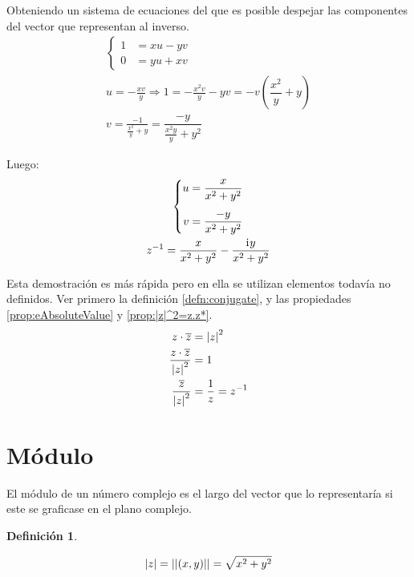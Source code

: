 \documentclass[a5paper,12pt,twoside]{book}
\newtheorem{defn}{{Definición}}[chapter]
\begin{document}
Obteniendo un sistema de ecuaciones del que es posible despejar las componentes del vector que representan al inverso.
\begin{gather*}
    \left\{
    \begin{aligned}
        1 &= xu-yv
        \\
        0 &= yu+xv
    \end{aligned}
    \right.
    \\
    u = -\frac{xv}{y} \Rightarrow 1= -\frac{x^2v}{y}-yv = -v\left( \dfrac{x^2}{y}+y \right)
    \\
    v=\frac{-1}{\frac{x^2}{y}+y}=\dfrac{-y}{\frac{x^2y}{y}+y^2}
\end{gather*}

Luego:
\begin{gather*}
    \left\{
    \begin{aligned}
        u &= \frac{x}{x^2+y^2}
        \\[1ex]
        v &= \frac{-y}{x^2+y^2}
    \end{aligned}
    \right.
    \\
    z^{-1} = \dfrac{x}{x^2+y^2}-\dfrac{\mathrm{i}\mkern1mu y}{x^2+y^2}
\end{gather*}


Esta demostración es más rápida pero en ella se utilizan elementos todavía no definidos. Ver primero la definición \ref{defn:conjugate}, y las propiedades \ref{prop:eAbsoluteValue} y \ref{prop:|z|^2=z.z*}.
\begin{align*}
    z \cdot \overline{z} &= {\left| {z} \right|}^2
    \\
    \frac{z \cdot \overline{z}}{{\left| {z} \right|}^2} &= 1
    \\
    \frac{\overline{z}}{{\left| {z} \right|}^2} &= \dfrac{1}{z}=z^{-1}
\end{align*}


\section{Módulo}

El módulo de un número complejo es el largo del vector que lo representaría si este se graficase en el plano complejo.

\begin{mdframed}[style=MyFrame1]
    \begin{defn}
    \end{defn}
    \begin{equation*}
        {\left| {z} \right|} = {\left|\left| {(x,y)} \right|\right|} = \sqrt{x^2+y^2}
    \end{equation*}
\end{mdframed}
\end{document}
